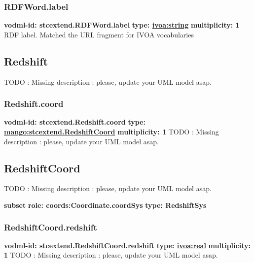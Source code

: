     \subsubsection{RDFWord.label}
      \textbf{vodml-id: stcextend.RDFWord.label} \newline
      \textbf{type: \hyperref[sect:ivoa]{ivoa:string}} \newline
      \textbf{multiplicity: 1} \newline 
      RDF label. Matched the URL fragment for IVOA vocabularies

  \subsection{Redshift}
  \label{sect:stcextend.Redshift}
    TODO : Missing description : please, update your UML model asap.

    \subsubsection{Redshift.coord}
      \textbf{vodml-id: stcextend.Redshift.coord} \newline
      \textbf{type: \hyperref[sect:stcextend.RedshiftCoord]{mango:stcextend.RedshiftCoord}} \newline
      \textbf{multiplicity: 1} \newline 
      TODO : Missing description : please, update your UML model asap.

  \subsection{RedshiftCoord}
  \label{sect:stcextend.RedshiftCoord}
    TODO : Missing description : please, update your UML model asap.

    \noindent \textbf{subset} \newline
    \indent   \textbf{role: coords:Coordinate.coordSys} \newline
    \indent   \textbf{type: RedshiftSys} \newline


    \subsubsection{RedshiftCoord.redshift}
      \textbf{vodml-id: stcextend.RedshiftCoord.redshift} \newline
      \textbf{type: \hyperref[sect:ivoa]{ivoa:real}} \newline
      \textbf{multiplicity: 1} \newline 
      TODO : Missing description : please, update your UML model asap.

